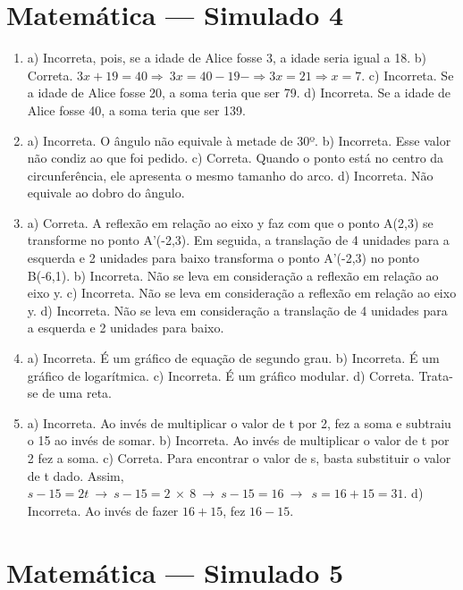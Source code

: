 \section*{Matemática — Simulado 4}

\begin{enumerate}
\item a) Incorreta, pois, se a idade de Alice fosse 3, a idade seria igual a 18.
b) Correta.
$3x + 19 = 40 \Rightarrow \ 3x = 40 - 19 - \Rightarrow 3x = 21 \Rightarrow x = 7$.
c) Incorreta. Se a idade de Alice fosse 20, a soma teria que ser 79.
d) Incorreta. Se a idade de Alice fosse 40, a soma teria que ser 139.


\item a) Incorreta. O ângulo não equivale à metade de 30º.
b) Incorreta. Esse valor não condiz ao que foi pedido.
c) Correta. Quando o ponto está no centro da circunferência, ele apresenta o mesmo tamanho do arco.
d) Incorreta. Não equivale ao dobro do ângulo.


\item a) Correta. A reflexão em relação ao eixo y faz com que o ponto
A(2,3) se transforme no ponto A'(-2,3). Em seguida, a translação de 4 unidades para a esquerda e 2 unidades para baixo transforma o ponto A'(-2,3) no ponto B(-6,1).
b) Incorreta. Não se leva em consideração a reflexão em relação ao eixo y.
c) Incorreta. Não se leva em consideração a reflexão em relação ao eixo y.
d) Incorreta. Não se leva em consideração a translação de 4 unidades para a esquerda e 2 unidades para baixo.


\item a) Incorreta. É um gráfico de equação de segundo grau.
b) Incorreta. É um gráfico de logarítmica.
c) Incorreta. É um gráfico modular.
d) Correta. Trata-se de uma reta.


\item a) Incorreta. Ao invés de multiplicar o valor de t por 2, fez a soma e subtraiu o 15 ao invés de somar.
b) Incorreta. Ao invés de multiplicar o valor de t por 2 fez a soma.
c) Correta. Para encontrar o valor de s, basta substituir o valor de t dado. Assim, $s - 15 = 2t\  \rightarrow \ s - 15 = 2\  \times \ 8\  \rightarrow \ s - 15 = 16\  \rightarrow \ \ s = 16 + 15 = 31$.
d) Incorreta. Ao invés de fazer $16 + 15$, fez $16-15$.
\end{enumerate}

\section*{Matemática — Simulado 5} 

